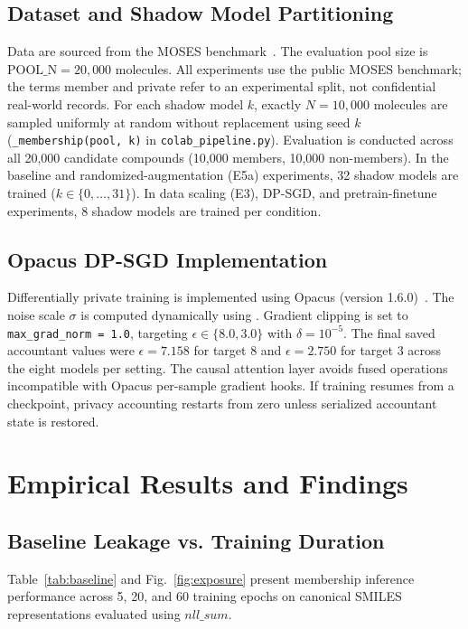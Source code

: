 \documentclass[10pt,journal,compsoc]{IEEEtran}
\begin{document}
\subsection{Dataset and Shadow Model Partitioning}
Data are sourced from the MOSES benchmark~\cite{polykovskiy2020molecular}. The evaluation pool size is $\text{POOL\_N} = 20,000$ molecules. All experiments use the public MOSES benchmark; the terms member and private refer to an experimental split, not confidential real-world records. For each shadow model $k$, exactly $N = 10,000$ molecules are sampled uniformly at random without replacement using seed $k$ (\texttt{\_membership(pool, k)} in \texttt{colab\_pipeline.py}). Evaluation is conducted across all 20,000 candidate compounds (10,000 members, 10,000 non-members). In the baseline and randomized-augmentation (E5a) experiments, 32 shadow models are trained ($k \in \{0, \dots, 31\}$). In data scaling (E3), DP-SGD, and pretrain-finetune experiments, 8 shadow models are trained per condition.

\subsection{Opacus DP-SGD Implementation}
Differentially private training is implemented using Opacus (version 1.6.0)~\cite{opacus2021}. The noise scale $\sigma$ is computed dynamically using . Gradient clipping is set to \texttt{max\_grad\_norm = 1.0}, targeting $\epsilon \in \{8.0, 3.0\}$ with $\delta = 10^{-5}$. The final saved accountant values were $\epsilon=7.158$ for target 8 and $\epsilon=2.750$ for target 3 across the eight models per setting. The causal attention layer avoids fused operations incompatible with Opacus per-sample gradient hooks. If training resumes from a checkpoint, privacy accounting restarts from zero unless serialized accountant state is restored.

\section{Empirical Results and Findings}

\subsection{Baseline Leakage vs. Training Duration}
Table~\ref{tab:baseline} and Fig.~\ref{fig:exposure} present membership inference performance across 5, 20, and 60 training epochs on canonical SMILES representations evaluated using $nll\_sum$.
\end{document}
